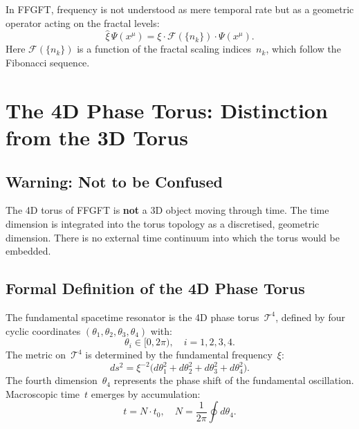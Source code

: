 In FFGFT, frequency is not understood as mere temporal rate but as a
geometric operator acting on the fractal levels:
\begin{equation}
  \hat{\xi}\,\Psi(x^\mu) = \xi \cdot \mathcal{F}(\{n_k\}) \cdot \Psi(x^\mu).
\end{equation}
Here $\mathcal{F}(\{n_k\})$ is a function of the fractal scaling
indices~$n_k$, which follow the Fibonacci sequence.

\section{The 4D Phase Torus: Distinction from the 3D Torus}

\subsection{Warning: Not to be Confused}

\begin{warnbox}
The 4D torus of FFGFT is \textbf{not} a 3D object moving through time.
The time dimension is integrated into the torus topology as a discretised,
geometric dimension. There is no external time continuum into which the
torus would be embedded.
\end{warnbox}

\subsection{Formal Definition of the 4D Phase Torus}

The fundamental spacetime resonator is the 4D phase torus~$\mathcal{T}^4$,
defined by four cyclic coordinates $(\theta_1, \theta_2, \theta_3,
\theta_4)$ with:
\begin{equation}
  \theta_i \in [0, 2\pi),\quad i = 1,2,3,4.
\end{equation}
The metric on~$\mathcal{T}^4$ is determined by the fundamental
frequency~$\xi$:
\begin{equation}
  ds^2 = \xi^{-2}
         \bigl(d\theta_1^2 + d\theta_2^2 + d\theta_3^2 + d\theta_4^2\bigr).
  \label{eq:metric}
\end{equation}
The fourth dimension~$\theta_4$ represents the phase shift of the
fundamental oscillation. Macroscopic time~$t$ emerges by accumulation:
\begin{equation}
  t = N \cdot t_0, \quad N = \frac{1}{2\pi}\oint d\theta_4.
\end{equation}

